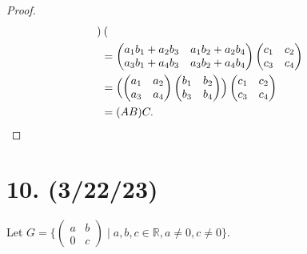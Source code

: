 \documentclass{article}
\begin{document}
\begin{proof}
\begin{align*}
\begin{pmatrix}
        \end{pmatrix} \\
        &= \begin{pmatrix}a_1 b_1 + a_2 b_3 & a_1 b_2 + a_2 b_4\\a_3 b_1 + a_4 b_3 & a_3 b_2 + a_4 b_4\end{pmatrix}\begin{pmatrix}c_1 & c_2 \\ c_3 & c_4\end{pmatrix} \\
        &= \Bigl(\begin{pmatrix}a_1 & a_2\\a_3 & a_4\end{pmatrix}\begin{pmatrix}b_1 & b_2\\b_3 & b_4\end{pmatrix}\Bigr)\begin{pmatrix}c_1 & c_2\\c_3 & c_4\end{pmatrix} \\
        &= (AB)C.
    \end{align*}
\end{proof}

\section*{10. (3/22/23)}

Let $G = \{ \begin{pmatrix}a & b \\ 0 & c\end{pmatrix} \mid a, b, c \in \mathbb{R}, a \neq 0, c \neq 0 \}$.
\end{document}
